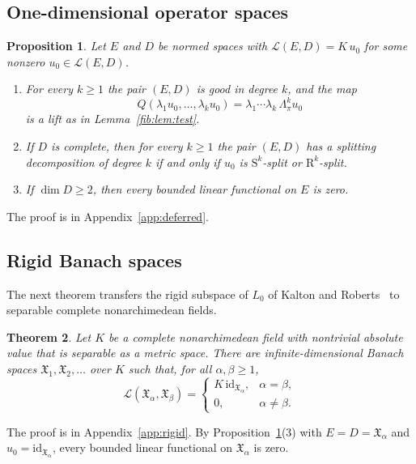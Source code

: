 \documentclass[11pt]{amsart}
\newtheorem{theorem}{Theorem}[section]
\newtheorem{proposition}[theorem]{Proposition}
\theoremstyle{definition}
\theoremstyle{remark}
\numberwithin{equation}{section}
\newcommand{\cL}{\mathcal L}
\newcommand{\id}{\mathrm{id}}
\theoremstyle{plain}
\theoremstyle{definition}
\theoremstyle{plain}
\newcommand{\fX}{\mathfrak X}
\begin{document}
\subsection{One-dimensional operator spaces}

\begin{proposition}\label{bey:prop:one-dim}
Let $E$ and $D$ be normed spaces with $\cL(E,D)=K\,u_0$ for some nonzero $u_0\in\cL(E,D)$.
\begin{enumerate}
\item For every $k\ge1$ the pair $(E,D)$ is good in degree $k$, and the map
\[
Q(\lambda_1u_0,\dots,\lambda_ku_0)=\lambda_1\cdots\lambda_k\,\Lambda^k_\pi u_0
\]
is a lift as in Lemma~\ref{fib:lem:test}.
\item If $D$ is complete, then for every $k\ge1$ the pair $(E,D)$ has a splitting decomposition of degree $k$ if and
only if $u_0$ is $\mathrm S^k$-split or $\mathrm R^k$-split.
\item If $\dim D\ge2$, then every bounded linear functional on $E$ is zero.
\end{enumerate}
\end{proposition}

The proof is in Appendix~\ref{app:deferred}.

\subsection{Rigid Banach spaces}

The next theorem transfers the rigid subspace of $L_0$ of Kalton and Roberts~\cite{KR} to separable complete
nonarchimedean fields.

\begin{theorem}\label{bey:thm:rigid}
Let $K$ be a complete nonarchimedean field with nontrivial absolute value that is separable as a metric space. There
are infinite-dimensional Banach spaces $\fX_1,\fX_2,\dots$ over $K$ such that, for all $\alpha,\beta\ge1$,
\[
\cL(\fX_\alpha,\fX_\beta)=
\begin{cases}
K\,\id_{\fX_\alpha},&\alpha=\beta,\\
0,&\alpha\ne\beta.
\end{cases}
\]
\end{theorem}

The proof is in Appendix~\ref{app:rigid}. By Proposition~\ref{bey:prop:one-dim}(3) with $E=D=\fX_\alpha$ and
$u_0=\id_{\fX_\alpha}$, every bounded linear functional on $\fX_\alpha$ is zero.
\end{document}
